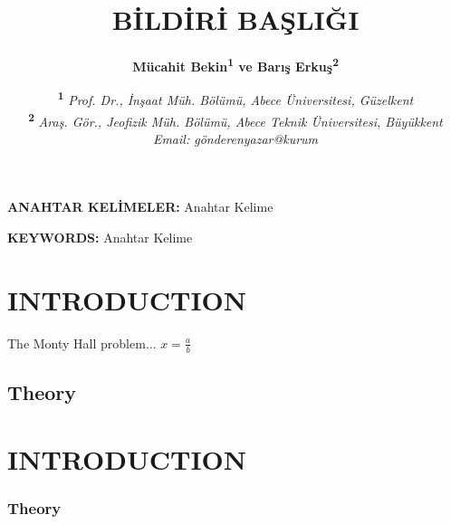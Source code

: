 \documentclass[]{eqconf}
\title{BİLDİRİ BAŞLIĞI\vspace{2pt}}
\author{\textbf{%
		Mücahit Bekin\textsuperscript{1} ve
		Barış Erkuş\textsuperscript{2}\vspace{1pt}%
}}
\date{\small%
\textsuperscript{\textbf{1}}
\textit{Prof. Dr., İnşaat Müh. Bölümü, Abece Üniversitesi, Güzelkent}\\
\textsuperscript{\textbf{2}}
\textit{Araş. Gör., Jeofizik Müh. Bölümü, Abece Teknik Üniversitesi, 
Büyükkent}\\
\textit{Email: gönderenyazar@kurum}%
}
\begin{document}
 
\maketitle

\thispagestyle{firststyle}
 
\begin{ozet}
	
\blindtext

\textbf{ANAHTAR KELİMELER:} Anahtar Kelime

\end{ozet}

\begin{ozeteng}
	
	\blindtext
	
\textbf{KEYWORDS:} Anahtar Kelime
	
\end{ozeteng}

\vspace{1em}
 
\section{INTRODUCTION}
 
The Monty Hall problem...
$x=\frac{a}{b}$
 
\subsection{Theory}

\blindtext

\section{INTRODUCTION}

\blindtext

\subsubsection*{Theory}

\blindtext

\blindtext

\blindtext

\blindtext

\blindtext

\blindtext

\blindtext

\blindtext

\blindtext

\blindtext
\end{document}
